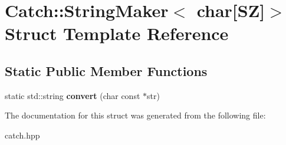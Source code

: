 \hypertarget{structCatch_1_1StringMaker_3_01char[SZ]_4}{}\section{Catch\+::String\+Maker$<$ char\mbox{[}SZ\mbox{]}$>$ Struct Template Reference}
\label{structCatch_1_1StringMaker_3_01char[SZ]_4}
\subsection*{Static Public Member Functions}
\begin{DoxyCompactItemize}
\item 
\mbox{\label{structCatch_1_1StringMaker_3_01char[SZ]_4_a095e415534f9145300271befe9853357}} 
static std\+::string {\bfseries convert} (char const $\ast$str)
\end{DoxyCompactItemize}


The documentation for this struct was generated from the following file\+:\begin{DoxyCompactItemize}
\item 
catch.\+hpp\end{DoxyCompactItemize}
